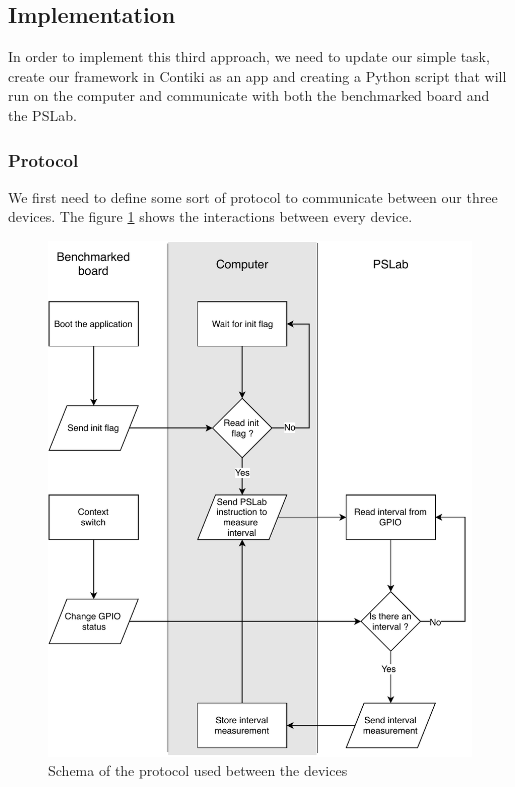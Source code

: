 \subsection{Implementation}

In order to implement this third approach, we need to update our simple task, create our framework in Contiki as an app and creating a Python script that will run on the computer and communicate with both the benchmarked board and the PSLab.

\subsubsection{Protocol}

We first need to define some sort of protocol to communicate between our three devices.
The figure \ref{fig:external-protocol} shows the interactions between every device.

\begin{figure}[!ht]
  \centering
  \includegraphics[scale=0.7]{assets/external-protocol.pdf}
  \caption{\label{fig:external-protocol}Schema of the protocol used between the devices}
\end{figure}

